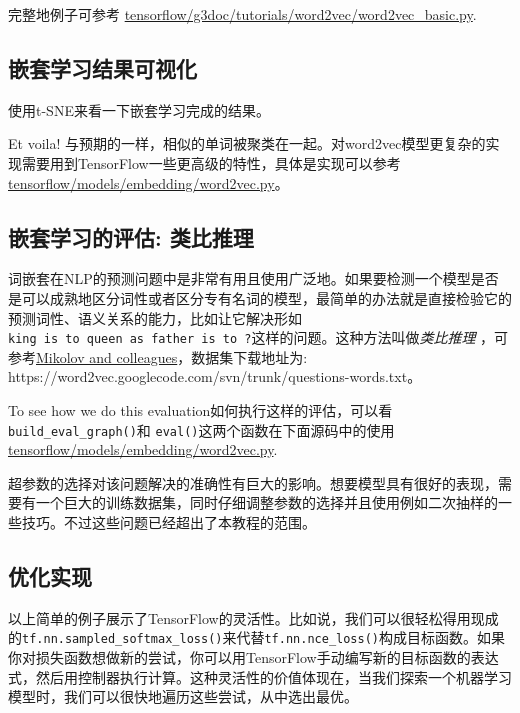 完整地例子可参考
\href{./word2vec_basic.py}{tensorflow/g3doc/tutorials/word2vec/word2vec\_basic.py}.

\subsection{嵌套学习结果可视化
}\label{ux5d4cux5957ux5b66ux4e60ux7ed3ux679cux53efux89c6ux5316}

使用t-SNE来看一下嵌套学习完成的结果。

Et voila!
与预期的一样，相似的单词被聚类在一起。对word2vec模型更复杂的实现需要用到TensorFlow一些更高级的特性，具体是实现可以参考
\href{https://tensorflow.googlesource.com/tensorflow/+/master/tensorflow/models/embedding/word2vec.py}{tensorflow/models/embedding/word2vec.py}。

\subsection{嵌套学习的评估: 类比推理
}\label{ux5d4cux5957ux5b66ux4e60ux7684ux8bc4ux4f30-ux7c7bux6bd4ux63a8ux7406}

词嵌套在NLP的预测问题中是非常有用且使用广泛地。如果要检测一个模型是否是可以成熟地区分词性或者区分专有名词的模型，最简单的办法就是直接检验它的预测词性、语义关系的能力，比如让它解决形如\texttt{king\ is\ to\ queen\ as\ father\ is\ to\ ?}这样的问题。这种方法叫做\emph{类比推理}
，可参考\href{http://msr-waypoint.com/en-us/um/people/gzweig/Pubs/NAACL2013Regularities.pdf}{Mikolov
and colleagues}，数据集下载地址为:
https://word2vec.googlecode.com/svn/trunk/questions-words.txt。

To see how we do this
evaluation如何执行这样的评估，可以看\texttt{build\_eval\_graph()}和
\texttt{eval()}这两个函数在下面源码中的使用
\href{https://tensorflow.googlesource.com/tensorflow/+/master/tensorflow/models/embedding/word2vec.py}{tensorflow/models/embedding/word2vec.py}.

超参数的选择对该问题解决的准确性有巨大的影响。想要模型具有很好的表现，需要有一个巨大的训练数据集，同时仔细调整参数的选择并且使用例如二次抽样的一些技巧。不过这些问题已经超出了本教程的范围。

\subsection{优化实现 }\label{ux4f18ux5316ux5b9eux73b0}

以上简单的例子展示了TensorFlow的灵活性。比如说，我们可以很轻松得用现成的\texttt{tf.nn.sampled\_softmax\_loss()}来代替\texttt{tf.nn.nce\_loss()}构成目标函数。如果你对损失函数想做新的尝试，你可以用TensorFlow手动编写新的目标函数的表达式，然后用控制器执行计算。这种灵活性的价值体现在，当我们探索一个机器学习模型时，我们可以很快地遍历这些尝试，从中选出最优。


